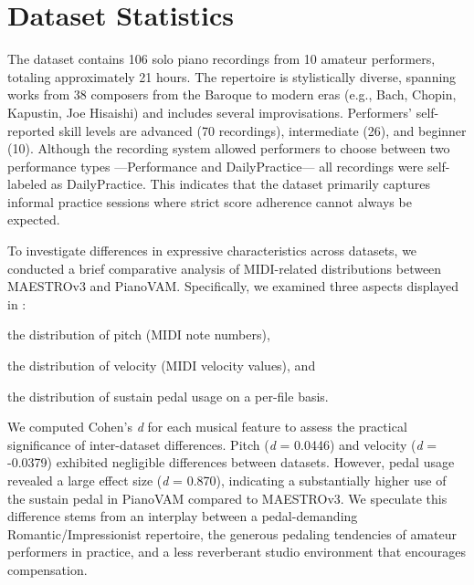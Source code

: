 \documentclass{article}
\begin{document}
\section{Dataset Statistics}\label{sec:dataset-statistics}

The dataset contains 106 solo piano recordings from 10 amateur performers, totaling approximately 21 hours. The repertoire is stylistically diverse, spanning works from 38 composers from the Baroque to modern eras (e.g., Bach, Chopin, Kapustin, Joe Hisaishi) and includes several improvisations. Performers' self-reported skill levels are advanced (70 recordings), intermediate (26), and beginner (10). Although the recording system allowed performers to choose between two performance types ---Performance and DailyPractice--- all recordings were self-labeled as DailyPractice. This indicates that the dataset primarily captures informal practice sessions where strict score adherence cannot always be expected. %

To investigate differences in expressive characteristics across datasets, we conducted a brief comparative analysis of MIDI-related distributions between MAESTROv3 and PianoVAM. Specifically, we examined three aspects displayed in : 
\begin{inparaenum}[(i)]
    \item the distribution of pitch (MIDI note numbers), 
    \item the distribution of velocity (MIDI velocity values), and 
    \item the distribution of sustain pedal usage on a per-file basis.
\end{inparaenum}
We computed Cohen's \textit{d} for each musical feature to assess the practical significance of inter-dataset differences.  Pitch (\textit{d} = 0.0446) and velocity (\textit{d} = -0.0379) exhibited negligible differences between datasets. However, pedal usage revealed a large effect size (\textit{d} = 0.870), indicating a substantially higher use of the sustain pedal in PianoVAM compared to MAESTROv3. We speculate this difference stems from an interplay between a pedal-demanding Romantic/Impressionist repertoire, the generous pedaling tendencies of amateur performers in practice, and a less reverberant studio environment that encourages compensation. %
 
\end{document}
